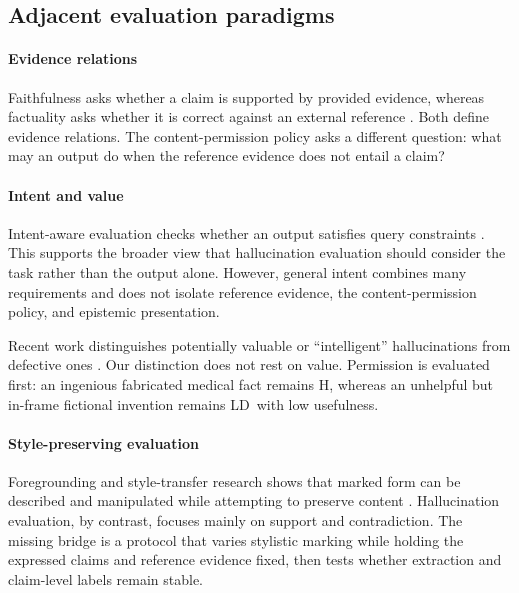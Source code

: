 \documentclass{clv2025}
\newcommand{\LD}{\textsc{LD}}
\newcommand{\Hall}{\textsc{H}}
\begin{document}
\subsection{Adjacent evaluation paradigms}
\paragraph{Evidence relations}
Faithfulness asks whether a claim is supported by provided evidence, whereas factuality asks whether it is correct against an external reference \citep{maynez_faithfulness_2020,kryscinski_evaluating_2020}.
Both define evidence relations.
The content-permission policy asks a different question: what may an output do when the reference evidence does not entail a claim?

\paragraph{Intent and value}
Intent-aware evaluation checks whether an output satisfies query constraints \citep{hao_faithqa_2025}.
This supports the broader view that hallucination evaluation should consider the task rather than the output alone.
However, general intent combines many requirements and does not isolate reference evidence, the content-permission policy, and epistemic presentation.

Recent work distinguishes potentially valuable or ``intelligent'' hallucinations from defective ones \citep{jiang_survey_2024,sui_confabulation_2024,yang_hicbench_2025}.
Our distinction does not rest on value.
Permission is evaluated first: an ingenious fabricated medical fact remains \Hall, whereas an unhelpful but in-frame fictional invention remains \LD\ with low usefulness.

\paragraph{Style-preserving evaluation}
Foregrounding and style-transfer research shows that marked form can be described and manipulated while attempting to preserve content \citep{leech_short_style_1981,vanpeer_stylistics_2020,pavlick_empirical_2016,rao_dear_2018,briakou_evaluating_2021}.
Hallucination evaluation, by contrast, focuses mainly on support and contradiction.
The missing bridge is a protocol that varies stylistic marking while holding the expressed claims and reference evidence fixed, then tests whether extraction and claim-level labels remain stable.
\end{document}
